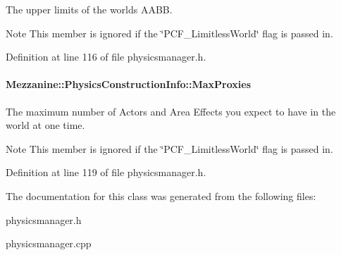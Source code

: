 The upper limits of the worlds AABB. 

\begin{DoxyNote}{Note}
This member is ignored if the \char`\"{}PCF\_\-LimitlessWorld\char`\"{} flag is passed in. 
\end{DoxyNote}


Definition at line 116 of file physicsmanager.h.

\hypertarget{classMezzanine_1_1PhysicsConstructionInfo_a33cf4caa561d10c3d1df0ea150612c95}{
\paragraph[{MaxProxies}]{ {\bf Mezzanine::PhysicsConstructionInfo::MaxProxies}}\hfill}
\label{classMezzanine_1_1PhysicsConstructionInfo_a33cf4caa561d10c3d1df0ea150612c95}


The maximum number of Actors and Area Effects you expect to have in the world at one time. 

\begin{DoxyNote}{Note}
This member is ignored if the \char`\"{}PCF\_\-LimitlessWorld\char`\"{} flag is passed in. 
\end{DoxyNote}


Definition at line 119 of file physicsmanager.h.



The documentation for this class was generated from the following files:\begin{DoxyCompactItemize}
\item 
physicsmanager.h\item 
physicsmanager.cpp\end{DoxyCompactItemize}
